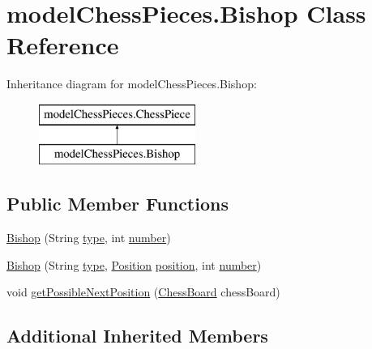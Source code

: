 \hypertarget{classmodel_chess_pieces_1_1_bishop}{\section{model\+Chess\+Pieces.\+Bishop Class Reference}
\label{classmodel_chess_pieces_1_1_bishop}
}
Inheritance diagram for model\+Chess\+Pieces.\+Bishop\+:\begin{figure}[H]
\begin{center}
\leavevmode
\includegraphics[height=2.000000cm]{classmodel_chess_pieces_1_1_bishop}
\end{center}
\end{figure}
\subsection*{Public Member Functions}
\begin{DoxyCompactItemize}
\item 
\hyperlink{classmodel_chess_pieces_1_1_bishop_ae2d6a71368f3304f8191acdf20949dc0}{Bishop} (String \hyperlink{classmodel_chess_pieces_1_1_chess_piece_a195487ca88c197af7c1604247be31db2}{type}, int \hyperlink{classmodel_chess_pieces_1_1_chess_piece_a979e63b99128333883acedc38d25dc87}{number})
\item 
\hyperlink{classmodel_chess_pieces_1_1_bishop_a224d00fc7396150863db9df71428a63c}{Bishop} (String \hyperlink{classmodel_chess_pieces_1_1_chess_piece_a195487ca88c197af7c1604247be31db2}{type}, \hyperlink{classmodel_core_1_1_position}{Position} \hyperlink{classmodel_chess_pieces_1_1_chess_piece_a3d4362d5b28f6edb14161196d9c6807d}{position}, int \hyperlink{classmodel_chess_pieces_1_1_chess_piece_a979e63b99128333883acedc38d25dc87}{number})
\item 
void \hyperlink{classmodel_chess_pieces_1_1_bishop_aedae3e2213937b96cc893ccb89fc205a}{get\+Possible\+Next\+Position} (\hyperlink{classmodel_core_1_1_chess_board}{Chess\+Board} chess\+Board)
\end{DoxyCompactItemize}
\subsection*{Additional Inherited Members}


